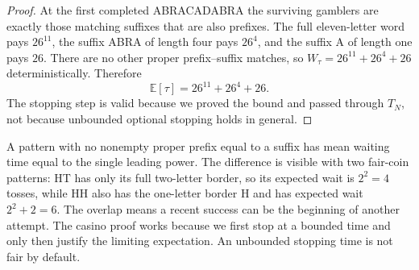 \begin{proof}
At the first completed ABRACADABRA the surviving gamblers are exactly those matching suffixes that are also prefixes. The full eleven-letter word pays $26^{11}$, the suffix ABRA of length four pays $26^4$, and the suffix A of length one pays $26$. There are no other proper prefix--suffix matches, so $W_\tau=26^{11}+26^4+26$ deterministically. Therefore
\[
 \mathbb E[\tau]=26^{11}+26^4+26.
\]
The stopping step is valid because we proved the bound and passed through $T_N$, not because unbounded optional stopping holds in general.
\end{proof}

A pattern with no nonempty proper prefix equal to a suffix has mean waiting time equal to the single leading power. The difference is visible with two fair-coin patterns: HT has only its full two-letter border, so its expected wait is $2^2=4$ tosses, while HH also has the one-letter border H and has expected wait $2^2+2=6$. The overlap means a recent success can be the beginning of another attempt. The casino proof works because we first stop at a bounded time and only then justify the limiting expectation. An unbounded stopping time is not fair by default.

